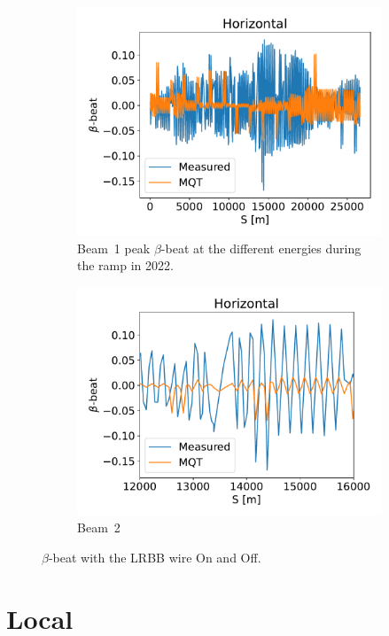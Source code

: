 \documentclass{cernatsnote}
\begin{document}
\begin{figure}[ht]
\begin{subfigure}{.5\textwidth}
  \centering
  \includegraphics[width=.8\linewidth]{ramp/mqt_in_ramp_1900GeV_horizontal.pdf}  
  \caption{Beam~1 peak $\beta$-beat at the different energies during the ramp in 2022.}
\end{subfigure}
\begin{subfigure}{.5\textwidth}
  \centering
  \includegraphics[width=.8\linewidth]{ramp/mqt_in_ramp_1900GeV_horizontal_zoom.pdf}  
  \caption{Beam~2}
\end{subfigure}
\caption{$\beta$-beat with the LRBB wire On and Off.}
\label{fig:ramp_mqt}
\end{figure}

\section{Local}
\end{document}
